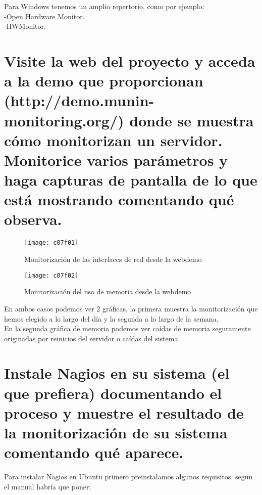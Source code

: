 Para Windows tenemos un amplio repertorio, como por ejemplo:\\
	-Open Hardware Monitor.\\
	-HWMonitor.\\
	

\section{Visite la web del proyecto y acceda a la demo que proporcionan (http://demo.munin-monitoring.org/) donde se muestra cómo monitorizan un servidor. Monitorice varios parámetros y haga capturas de pantalla de lo que está mostrando comentando qué observa.}	

\begin{figure}[H]
	\centering
	\texttt{[image: c07f01]}
	\caption{Monitorización de las interfaces de red desde la webdemo}
	\label{fig:c07f01}
\end{figure}
\begin{figure}[H]
	\centering
	\texttt{[image: c07f02]}
	\caption{Monitorización del uso de memoria desde la webdemo}
	\label{fig:c07f02}
\end{figure}

En ambos casos podemos ver 2 gráficas, la primera muestra la monitorización que hemos elegido a lo largo del día y la segunda a lo largo de la semana.\\
En la segunda gráfica de memoria podemos ver caídas de memoria seguramente originadas por reinicios del servidor o caídas del sistema.\\



\section{Instale Nagios en su sistema (el que prefiera)	documentando el proceso y muestre el resultado de la monitorización de su sistema comentando qué aparece. \cite{c02o}}


Para instalar Nagios en Ubuntu primero preinstalamos algunos requisitos. segun el manual habría que poner:\\

